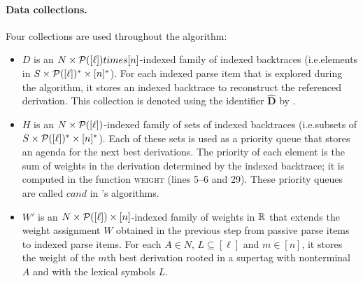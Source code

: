 \documentclass[../../document.tex]{subfiles}
\begin{document}
    \paragraph{Data collections.}
    Four collections are used throughout the algorithm:
    \begin{itemize}
        \item \(D\) is an \(N \times \mathcal{P}([\ell]) times [n]\)-indexed family of indexed backtraces (i.e.\@ elements in \(S \times \mathcal{P}([\ell])^* \times [n]^*\)).
            For each indexed parse item that is explored during the algorithm, it stores an indexed backtrace to reconstruct the referenced derivation.
            This collection is denoted using the identifier \(\hat{\mathbf{D}}\) by .
        \item \(H\) is an \(N \times \mathcal{P}([\ell])\)-indexed family of sets of indexed backtraces (i.e.\@ subsets of \(S \times \mathcal{P}([\ell])^* \times [n]^*\)).
            Each of these sets is used as a priority queue that stores an agenda for the next best derivations.
            The priority of each element is the sum of weights in the derivation determined by the indexed backtrace; it is computed in the function \textsc{weight} (lines 5--6 and 29).
            These priority queues are called \(\mathit{cand}\) in 's algorithms.
        \item \(W'\) is an \(N \times \mathcal{P}([\ell]) \times [n]\)-indexed family of weights in \(\mathbb{R}\) that extends the weight assignment \(W\) obtained in the previous step from passive parse items to indexed parse items.
            For each \(A\in N\), \(L \subseteq [\ell]\) and \(m \in [n]\), it stores the weight of the \(m\)th best derivation rooted in a supertag with  nonterminal \(A\) and with the lexical symbols \(L\).
    \end{itemize}
\end{document}
